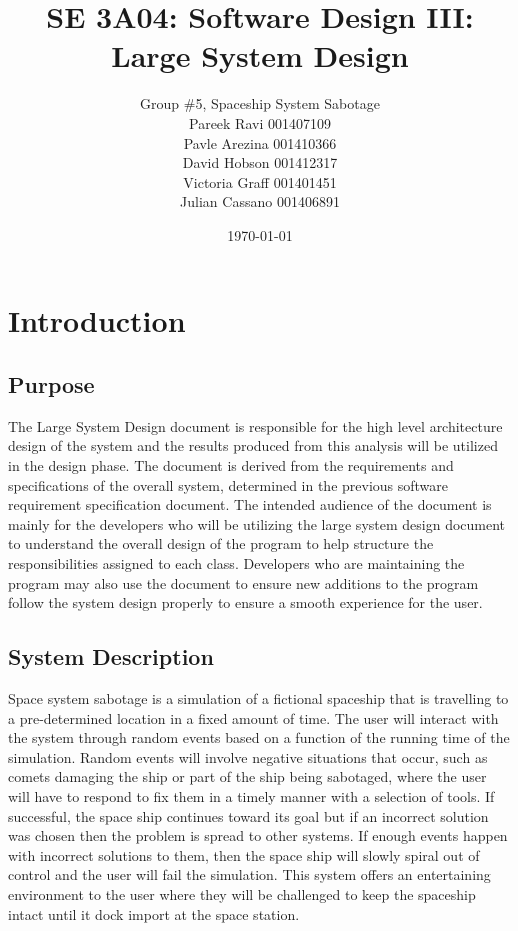 \documentclass[12pt, titlepage]{article}
\title{SE 3A04: Software Design III: Large System Design}
\author{Group \#5, Spaceship System Sabotage %
		\\Pareek Ravi 001407109
		\\Pavle Arezina 001410366
		\\David Hobson 001412317
		\\Victoria Graff 001401451
		\\Julian Cassano 001406891
}
\date{\today}
\newcommand\tab[1][1cm]{\hspace*{#1}}
\begin{document}
\maketitle	
{}
\tableofcontents
\listoftables
\listoffigures
\newpage

\section{Introduction}
\label{sec:introduction}


\subsection{Purpose}
\label{sub:purpose}
\tab The Large System Design document is responsible for the high level architecture design of the system and the results produced from this analysis will be utilized in the design phase. The document is derived from the requirements and specifications of the overall system, determined in the previous software requirement specification document. The intended audience of the document is mainly for the developers who will be utilizing the large system design document to understand the overall design of the program to help structure the responsibilities assigned to each class. Developers who are maintaining the program may also use the document to ensure new additions to the program follow the system design properly to ensure a smooth experience for the user.

\subsection{System Description}
\label{sub:system_description}
\tab Space system sabotage is a simulation of a fictional spaceship that is travelling to a pre-determined location in a fixed amount of time. The user will interact with the system through random events based on a function of the running time of the simulation. Random events will involve negative situations that occur, such as comets damaging the ship or part of the ship being sabotaged, where the user will have to respond to fix them in a timely manner with a selection of tools. If successful, the space ship continues toward its goal but if an incorrect solution was chosen then the problem is spread to other systems. If enough events happen with incorrect solutions to them, then the space ship will slowly spiral out of control and the user will fail the simulation. This system offers an entertaining environment to the user where they will be challenged to keep the spaceship intact until it dock import at the space station.
\end{document}
